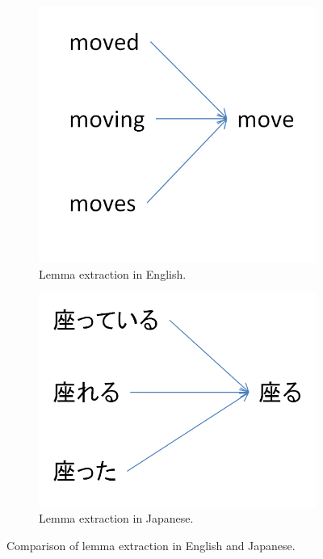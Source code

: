 \begin{figure}[ht]
    \begin{subfigure}{0.5\textwidth}
    \includegraphics[width=0.9\linewidth]{Cap2/LemmaEnglish}
    \caption{Lemma extraction in English.}
    \label{fig:lemmaeng}
    \end{subfigure}
    \begin{subfigure}{0.5\textwidth}
    \includegraphics[width=0.9\linewidth]{Cap2/LemmaJapanese}
    \caption{Lemma extraction in Japanese.}
    \label{fig:lemmajap}
    \end{subfigure}
    \caption{Comparison of lemma extraction in English and Japanese.}
    \label{fig:lemmas}
\end{figure}

